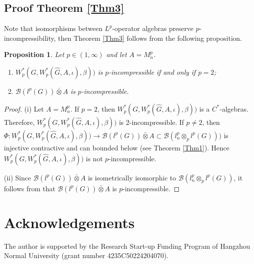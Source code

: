 \documentclass[reqno,11pt]{amsart}
\theoremstyle{plain}
\newtheorem{prop}[thm]{Proposition}
\theoremstyle{definition}
\theoremstyle{remark}
\begin{document}
\subsection{Proof Theorem \ref{Thm3}}
Note that isomorphisms between $L^p$-operator algebras preserve $p$-incompressibility, then Theorem \ref{Thm3} follows from the following proposition.
\begin{prop}
Let $p\in (1,\infty)$ and let $A=M_n^p$.
\begin{enumerate}
\item[(i)] $W^*_p(G,W^*_p(\hat{G},A,\iota),\beta))$ is $p$-incompressible if and only if $p=2$;
\item[(ii)]  $\mathcal{B}(l^p(G))\bar{\otimes} A$ is $p$-incompressible.
\end{enumerate}
\end{prop}
\begin{proof}
(i) Let $A=M_n^p$. If $p=2$, then $W^*_p(G,W^*_p(\hat{G},A,\iota),\beta))$ is a $C^*$-algebras. Therefore, $W^*_p(G,W^*_p(\hat{G},A,\iota),\beta))$ is $2$-incompressible. If $p\neq 2$, then $\Phi:W^*_p(G,W^*_p(\hat{G},A,\iota),\beta))\rightarrow \mathcal{B}(l^p(G))\bar{\otimes}A\subset\mathcal{B}(l_n^p\otimes_p l^p(G)))$ is injective contractive and can bounded below (see Theorem \ref{Thm1}). Hence $W^*_p(G,W^*_p(\hat{G},A,\iota),\beta))$ is not $p$-incompressible.

(ii) Since $\mathcal{B}(l^p(G))\bar{\otimes} A$ is isometrically isomorphic to $\mathcal{B}(l^p_n\otimes_p l^p(G))$, it follows from \cite{incompressible} that $\mathcal{B}(l^p(G))\bar{\otimes} A$ is $p$-incompressible.
\end{proof}





\section*{Acknowledgements}

The author is supported by the Research Start-up Funding Program of Hangzhou Normal University (grant number 4235C50224204070).


\end{document}
